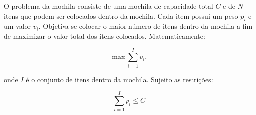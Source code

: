 \documentclass[a4paper,12pt]{article}
\begin{document}
\indent O problema da mochila consiste de uma mochila de capacidade total $C$ e de $N$ itens que podem ser colocados dentro da mochila. Cada item possui um peso $p_i$ e um valor $v_i$. Objetiva-se colocar o maior número de itens dentro da mochila a fim de maximizar o valor total dos itens colocados. Matematicamente:

\begin{equation}
    \max \sum\limits_{i=1}^{I}v_i,
\end{equation}

\noindent onde $I$ é o conjunto de itens dentro da mochila. Sujeito as restrições:

\begin{equation}
    \sum\limits_{i=1}^{I}p_i \leq C
\end{equation}
\end{document}
